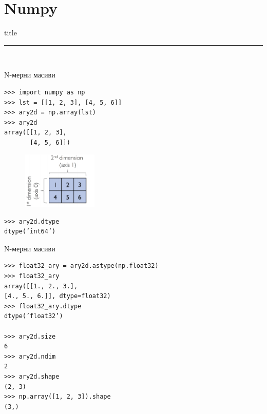 \documentclass{beamer}
\begin{document}

\section{Numpy}

\begin{frame}[plain]
  \vfill
  \centering
  \begin{beamercolorbox}[sep=8pt,center,shadow=true,rounded=true]{title}
    \par%
    \color{oxfordblue}\noindent\rule{10cm}{1pt} \\
  \end{beamercolorbox}
  \vfill
\end{frame}

\begin{frame}[fragile]{N-мерни масиви}
\begin{verbatim}
>>> import numpy as np
>>> lst = [[1, 2, 3], [4, 5, 6]]
>>> ary2d = np.array(lst)
>>> ary2d
array([[1, 2, 3],
       [4, 5, 6]])
\end{verbatim}
\begin{figure}
    \centering
    \includegraphics[width=0.32\textwidth]{np1.png}
\end{figure}
\begin{verbatim}
>>> ary2d.dtype
dtype(’int64’)
\end{verbatim}
\end{frame}

\begin{frame}[fragile]{N-мерни масиви}
\begin{verbatim}
>>> float32_ary = ary2d.astype(np.float32)
>>> float32_ary
array([[1., 2., 3.],
[4., 5., 6.]], dtype=float32)
>>> float32_ary.dtype
dtype(’float32’)

>>> ary2d.size
6
>>> ary2d.ndim
2
>>> ary2d.shape
(2, 3)
>>> np.array([1, 2, 3]).shape
(3,)
\end{verbatim}
\end{frame}
\end{document}
